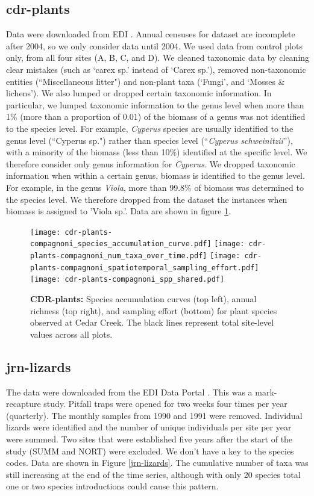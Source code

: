 \documentclass[11pt, oneside]{article}
\begin{document}
\subsection {cdr-plants}
Data were downloaded from EDI \citep{cdr-plants}.
Annual censuses for dataset are incomplete after 2004, so we only consider data until 2004. We used data from control plots only, from all four sites (A, B, C, and D). 
We cleaned taxonomic data by cleaning clear mistakes (such as `carex sp.' instead of `Carex sp.'), removed non-taxonomic entities (``Miscellaneous litter") and non-plant taxa (`Fungi', and `Mosses \& lichens').
We also lumped or dropped certain taxonomic information. 
In particular, we lumped taxonomic information to the genus level when more than 1$\%$ (more than a proportion of 0.01) of the biomass of a genus was not identified to the species level. 
For example, {\it Cyperus} species are usually identified to the genus level (``Cyperus  sp.") rather than species level (``{\it Cyperus schweinitzii}''), with a minority of the biomass (less than 10$\%$) identified at the specific level. We therefore consider only genus information for {\it Cyperus}. 
We dropped taxonomic information when within a certain genus, biomass is identified to the genus level. 
For example, in the genus {\it Viola}, more than 99.8$\%$ of biomass was determined to the species level. We therefore dropped from the dataset the instances when biomass is assigned to 'Viola sp.'.
Data are shown in figure \ref{cdr-plants}.

\begin{figure}[h!]
\centering
\texttt{[image: cdr-plants-compagnoni\_species\_accumulation\_curve.pdf]}
\texttt{[image: cdr-plants-compagnoni\_num\_taxa\_over\_time.pdf]}
\texttt{[image: cdr-plants-compagnoni\_spatiotemporal\_sampling\_effort.pdf]}
\texttt{[image: cdr-plants-compagnoni\_spp\_shared.pdf]}
\caption{{\bf CDR-plants:} Species accumulation curves (top left),  annual richness (top right), and sampling effort (bottom)  for plant species observed at Cedar Creek. The black lines represent total site-level values across all plots.}
\label{cdr-plants}
\end{figure}



\subsection {jrn-lizards}
The data were downloaded from the EDI Data Portal \citep{jrn-lizard}.
This was a mark-recapture study. 
Pitfall traps were opened for two weeks four times per year (quarterly). 
The monthly samples from 1990 and 1991 were removed.
Individual lizards were identified and the number of unique individuals per site per year were summed. 
Two sites that were established five years after the start of the study (SUMM and NORT) were excluded. 
We don't have a key to the species codes.
Data are shown in Figure \ref{jrn-lizards}.
The cumulative number of taxa was still increasing at the end of the time series, although with only 20 species total one or two species introductions could cause this pattern.
\end{document}
